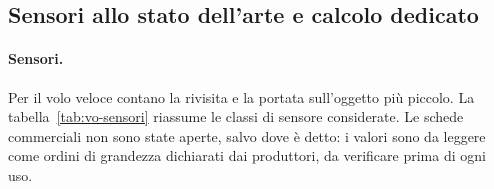 
\subsection{Sensori allo stato dell'arte e calcolo dedicato}\label{sec:vo-hw}

\paragraph{Sensori.} Per il volo veloce contano la rivisita e la portata sull'oggetto più piccolo. La tabella~\ref{tab:vo-sensori} riassume le classi di sensore considerate. Le schede commerciali non sono state aperte, salvo dove è detto: i valori sono da leggere come ordini di grandezza dichiarati dai produttori, da verificare prima di ogni uso.

